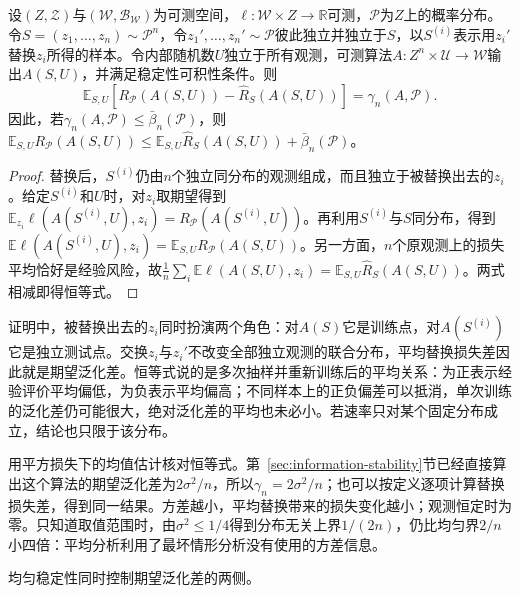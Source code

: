 \begin{theorem}[平均稳定性与期望风险]
\label{thm:on-average-generalization}
设$(Z,\mathcal Z)$与$(\mathcal W,\mathcal B_{\mathcal W})$为可测空间，$\ell:\mathcal W\times Z\to\mathbb R$可测，$\mathcal P$为$Z$上的概率分布。令$S=(z_1,\ldots,z_n)\sim\mathcal P^n$，令$z_1',\ldots,z_n'\sim\mathcal P$彼此独立并独立于$S$，以$S^{(i)}$表示用$z_i'$替换$z_i$所得的样本。令内部随机数$U$独立于所有观测，可测算法$A:Z^n\times\mathcal U\to\mathcal W$输出$A(S,U)$，并满足稳定性可积性条件。则
\begin{equation}
 \mathbb E_{S,U}\left[R_{\mathcal P}(A(S,U))-\hat R_S(A(S,U))\right]
 =\gamma_n(A,\mathcal P).
 \label{eq:on-average-generalization-identity}
\end{equation}
因此，若$\gamma_n(A,\mathcal P)\leq\bar\beta_n(\mathcal P)$，则$\mathbb E_{S,U}R_{\mathcal P}(A(S,U))\leq\mathbb E_{S,U}\hat R_S(A(S,U))+\bar\beta_n(\mathcal P)$。
\end{theorem}
\begin{proof}
替换后，$S^{(i)}$仍由$n$个独立同分布的观测组成，而且独立于被替换出去的$z_i$。给定$S^{(i)}$和$U$时，对$z_i$取期望得到$\mathbb E_{z_i}\ell(A(S^{(i)},U),z_i)=R_{\mathcal P}(A(S^{(i)},U))$。再利用$S^{(i)}$与$S$同分布，得到$\mathbb E\ell(A(S^{(i)},U),z_i)=\mathbb E_{S,U}R_{\mathcal P}(A(S,U))$。另一方面，$n$个原观测上的损失平均恰好是经验风险，故$\frac1n\sum_i\mathbb E\ell(A(S,U),z_i)=\mathbb E_{S,U}\hat R_S(A(S,U))$。两式相减即得恒等式。
\end{proof}

证明中，被替换出去的$z_i$同时扮演两个角色：对$A(S)$它是训练点，对$A(S^{(i)})$它是独立测试点。交换$z_i$与$z_i'$不改变全部独立观测的联合分布，平均替换损失差因此就是期望泛化差。恒等式说的是多次抽样并重新训练后的平均关系：为正表示经验评价平均偏低，为负表示平均偏高；不同样本上的正负偏差可以抵消，单次训练的泛化差仍可能很大，绝对泛化差的平均也未必小。若速率只对某个固定分布成立，结论也只限于该分布。

用平方损失下的均值估计核对恒等式。第~\ref{sec:information-stability}节已经直接算出这个算法的期望泛化差为$2\sigma^2/n$，所以$\gamma_n=2\sigma^2/n$；也可以按定义逐项计算替换损失差，得到同一结果。方差越小，平均替换带来的损失变化越小；观测恒定时为零。只知道取值范围时，由$\sigma^2\leq1/4$得到分布无关上界$1/(2n)$，仍比均匀界$2/n$小四倍：平均分析利用了最坏情形分析没有使用的方差信息。

均匀稳定性同时控制期望泛化差的两侧。

